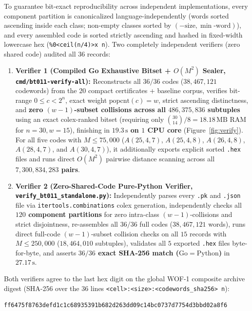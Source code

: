 \documentclass[11pt,letterpaper]{article}
\theoremstyle{plain}
\theoremstyle{definition}
\theoremstyle{remark}
\begin{document}
To guarantee bit-exact reproducibility across independent implementations, every component partition is canonicalized language-independently (words sorted ascending inside each class; non-empty classes sorted by $(-\text{size}, \min\text{-word})$), and every assembled code is sorted strictly ascending and hashed in fixed-width lowercase hex (\texttt{\%0<ceil(n/4)>x n}). Two completely independent verifiers (zero shared code) audited all $36$ records:
\begin{enumerate}[leftmargin=1.5em,itemsep=1.5pt]
    \item \textbf{Verifier 1 (Compiled Go Exhaustive Bitset + $O(M^2)$ Sealer, \texttt{cmd/bt011-verify-all}):} Reconstructs all $36/36$ codes ($38{,}467{,}121$ codewords) from the $20$ compact certificates + baseline corpus, verifies bit-range $0 \le c < 2^n$, exact weight $\mathrm{popcnt}(c) = w$, strict ascending distinctness, and \textbf{zero $(w{-}1)$-subset collisions across all $486{,}375{,}836$ subtuples} using an exact colex-ranked bitset (requiring only $\binom{30}{14}/8 = 18.18\,\mathrm{MB}$ RAM for $n = 30, w = 15$), finishing in \textbf{$19.3\,\mathrm{s}$ on $1$ CPU core} (Figure~\ref{fig:verify}). For all five codes with $M \le 75{,}000$ ($A(25,4,7)$, $A(25,4,8)$, $A(26,4,8)$, $A(28,4,7)$, and $A(30,4,7)$), it additionally exports explicit sorted \texttt{.hex} files and runs direct $O(M^2)$ pairwise distance scanning across all \textbf{$7{,}300{,}834{,}283$ pairs}.
    \item \textbf{Verifier 2 (Zero-Shared-Code Pure-Python Verifier, \texttt{verify\_\allowbreak bt011\_\allowbreak standalone.py}):} Independently parses every \texttt{.pk} and \texttt{.json} file via \texttt{itertools.combinations} colex generation, independently checks all \textbf{$120$ component partitions} for zero intra-class $(w{-}1)$-collisions and strict disjointness, re-assembles all $36/36$ full codes ($38{,}467{,}121$ words), runs direct full-code $(w{-}1)$-subset collision checks on all $15$ records with $M \le 250{,}000$ ($18{,}464{,}010$ subtuples), validates all $5$ exported \texttt{.hex} files byte-for-byte, and asserts \textbf{$36/36$ exact SHA-256 match ($\mathrm{Go} = \mathrm{Python}$)} in $27.17\,\mathrm{s}$.
\end{enumerate}
Both verifiers agree to the last hex digit on the global WOF-1 composite archive digest (SHA-256 over the $36$ lines \texttt{<cell>:<size>:<codewords\_sha256> n}):
\begin{center}
\texttt{\small ff6475f8763defd1c1c68935391b682d263dd09c14bc0737d7754d3bbd02a8f6}
\end{center}
\end{document}
